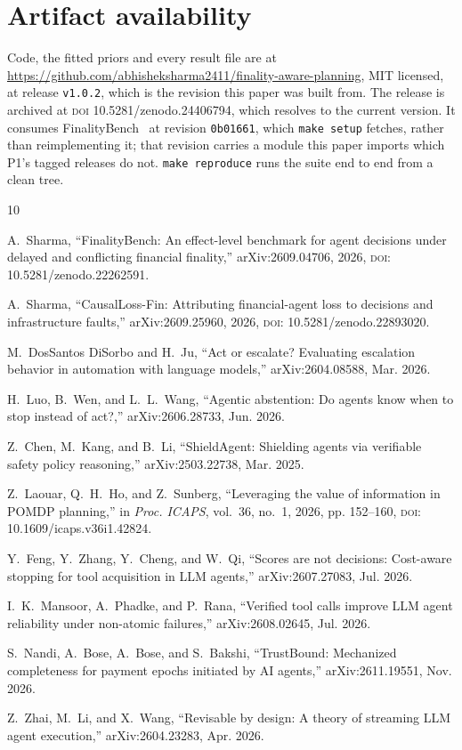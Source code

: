 \documentclass[conference]{IEEEtran}
\begin{document}
\section*{Artifact availability}

Code, the fitted priors and every result file are at
\url{https://github.com/abhisheksharma2411/finality-aware-planning}, MIT
licensed, at release \texttt{v1.0.2}, which is the revision this paper was
built from. The release is archived at \textsc{doi}
\mbox{10.5281/zenodo.24406794}, which resolves to the current version. It
consumes FinalityBench~\cite{finalitybench} at revision \texttt{0b01661},
which \texttt{make setup} fetches, rather than
reimplementing it; that revision carries a module this paper imports which
P1's tagged releases do not.
\texttt{make reproduce} runs the suite end to end from a clean tree.

\begin{thebibliography}{10}

A.~Sharma, ``FinalityBench: An effect-level benchmark for agent decisions under
delayed and conflicting financial finality,'' arXiv:2609.04706, 2026,
\textsc{doi}: \mbox{10.5281/zenodo.22262591}.

A.~Sharma, ``CausalLoss-Fin: Attributing financial-agent loss to decisions and
infrastructure faults,'' arXiv:2609.25960, 2026,
\textsc{doi}: \mbox{10.5281/zenodo.22893020}.

M.~DosSantos DiSorbo and H.~Ju, ``Act or escalate? Evaluating escalation
behavior in automation with language models,'' arXiv:2604.08588, Mar. 2026.

H.~Luo, B.~Wen, and L.~L.~Wang, ``Agentic abstention: Do agents know when to
stop instead of act?,'' arXiv:2606.28733, Jun. 2026.

Z.~Chen, M.~Kang, and B.~Li, ``ShieldAgent: Shielding agents via verifiable
safety policy reasoning,'' arXiv:2503.22738, Mar. 2025.

Z.~Laouar, Q.~H.~Ho, and Z.~Sunberg, ``Leveraging the value of information in
POMDP planning,'' in \emph{Proc. ICAPS}, vol.~36, no.~1, 2026, pp. 152--160,
\textsc{doi}: \mbox{10.1609/icaps.v36i1.42824}.

Y.~Feng, Y.~Zhang, Y.~Cheng, and W.~Qi, ``Scores are not decisions: Cost-aware
stopping for tool acquisition in LLM agents,'' arXiv:2607.27083, Jul. 2026.

I.~K.~Mansoor, A.~Phadke, and P.~Rana, ``Verified tool calls improve LLM agent
reliability under non-atomic failures,'' arXiv:2608.02645, Jul. 2026.

S.~Nandi, A.~Bose, A.~Bose, and S.~Bakshi, ``TrustBound: Mechanized
completeness for payment epochs initiated by AI agents,'' arXiv:2611.19551,
Nov. 2026.

Z.~Zhai, M.~Li, and X.~Wang, ``Revisable by design: A theory of streaming LLM
agent execution,'' arXiv:2604.23283, Apr. 2026.

\end{thebibliography}
\end{document}
